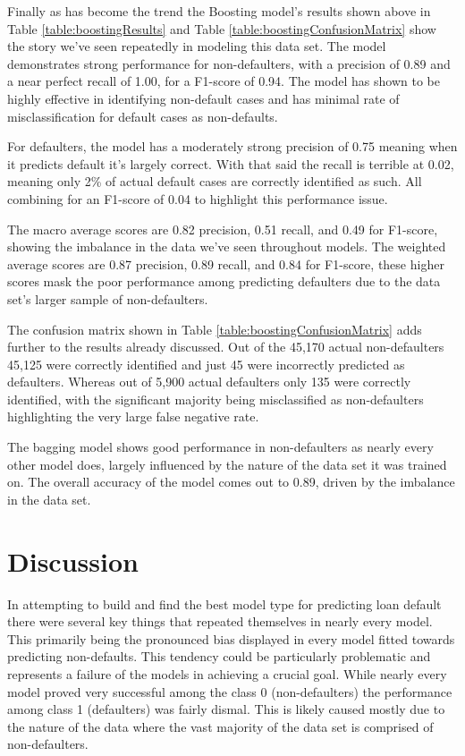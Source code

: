 \documentclass[12pt]{article}
\begin{document}
Finally as has become the trend the Boosting model's results shown above in Table \ref{table:boostingResults} and Table \ref{table:boostingConfusionMatrix} show the story we've seen repeatedly in modeling this data set. The model demonstrates strong performance for non-defaulters, with a precision of 0.89 and a near perfect recall of 1.00, for a F1-score of 0.94. The model has shown to be highly effective in identifying non-default cases and has minimal rate of misclassification for default cases as non-defaults.

For defaulters, the model has a moderately strong precision of 0.75 meaning when it predicts default it's largely correct. With that said the recall is terrible at 0.02, meaning only 2\% of actual default cases are correctly identified as such. All combining for an F1-score of 0.04 to highlight this performance issue.

The macro average scores are 0.82 precision, 0.51 recall, and 0.49 for F1-score, showing the imbalance in the data we've seen throughout models. The weighted average scores are 0.87 precision, 0.89 recall, and 0.84 for F1-score, these higher scores mask the poor performance among predicting defaulters due to the data set's larger sample of non-defaulters.

The confusion matrix shown in Table \ref{table:boostingConfusionMatrix} adds further to the results already discussed. Out of the 45,170 actual non-defaulters 45,125 were correctly identified and just 45 were incorrectly predicted as defaulters. Whereas out of 5,900 actual defaulters only 135 were correctly identified, with the significant majority being misclassified as non-defaulters highlighting the very large false negative rate.

The bagging model shows good performance in non-defaulters as nearly every other model does, largely influenced by the nature of the data set it was trained on. The overall accuracy of the model comes out to 0.89, driven by the imbalance in the data set.

\section{Discussion}
\label{sec:disc}

In attempting to build and find the best model type for predicting loan default there were several key things that repeated themselves in nearly every model. This primarily being the pronounced bias displayed in every model fitted towards predicting non-defaults. This tendency could be particularly problematic and represents a failure of the models in achieving a crucial goal. While nearly every model proved very successful among the class 0 (non-defaulters) the performance among class 1 (defaulters) was fairly dismal. This is likely caused mostly due to the nature of the data where the vast majority of the data set is comprised of non-defaulters. 
\end{document}
